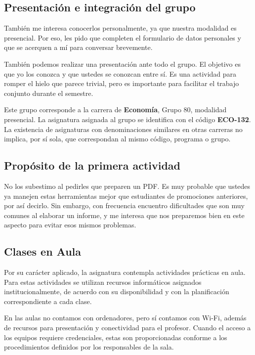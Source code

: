 \documentclass[10pt]{article}
\begin{document}
\subsection{Presentación e integración del grupo}

También me interesa conocerlos personalmente, ya que nuestra modalidad es presencial. Por eso, les pido que completen el formulario de datos personales y que se acerquen a mí para conversar brevemente.

También podemos realizar una presentación ante todo el grupo. El objetivo es que yo los conozca y que ustedes se conozcan entre sí. Es una actividad para romper el hielo que parece trivial, pero es importante para facilitar el trabajo conjunto durante el semestre.

Este grupo corresponde a la carrera de \textbf{Economía}, Grupo 80, modalidad presencial. La asignatura asignada al grupo se identifica con el código \textbf{ECO-132}. La existencia de asignaturas con denominaciones similares en otras carreras no implica, por sí sola, que correspondan al mismo código, programa o grupo.

\subsection{Propósito de la primera actividad}

No los subestimo al pedirles que preparen un PDF. Es muy probable que ustedes ya manejen estas herramientas mejor que estudiantes de promociones anteriores, por así decirlo. Sin embargo, con frecuencia encuentro dificultades que son muy comunes al elaborar un informe, y me interesa que nos preparemos bien en este aspecto para evitar esos mismos problemas.

\subsection{Clases en Aula}

Por su carácter aplicado, la asignatura contempla actividades prácticas en aula. Para estas actividades se utilizan recursos informáticos asignados institucionalmente, de acuerdo con su disponibilidad y con la planificación correspondiente a cada clase.\parencite{armoa2026planeamiento}

En las aulas no contamos con ordenadores, pero sí contamos con Wi-Fi, además de recursos para presentación y conectividad para el profesor. Cuando el acceso a los equipos requiere credenciales, estas son proporcionadas conforme a los procedimientos definidos por los responsables de la sala.
\end{document}
